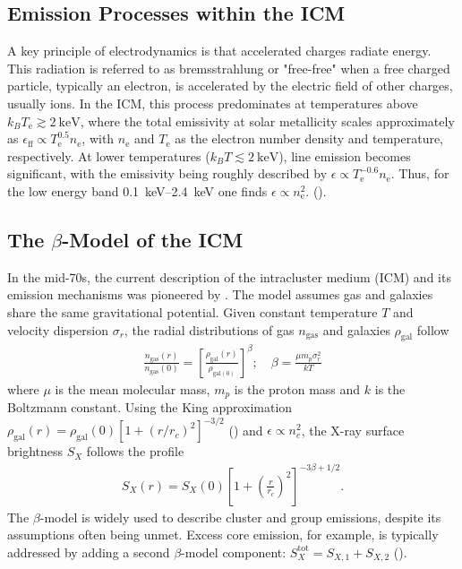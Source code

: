 \subsection{Emission Processes within the ICM}\label{subsec:emission}
A key principle of electrodynamics is that accelerated charges radiate energy. This radiation is referred to as bremsstrahlung or "free-free" when a free charged particle, typically an electron, is accelerated by the electric field of other charges, usually ions. In the ICM, this process predominates at temperatures above \(k_B T_\text{e} \gtrsim \SI{2}{\kilo\electronvolt}\), where the total emissivity at solar metallicity scales approximately as \(\epsilon_{\text{ff}} \propto T_\text{e}^{0.5} n_\text{e}\), 
with \(n_\text{e}\) and \(T_\text{e}\) as the electron number density and temperature, respectively. At lower temperatures (\(k_B T \lesssim \SI{2}{\kilo\electronvolt}\)), line emission becomes significant, with the emissivity being roughly described by \(\epsilon \propto T_\text{e}^{-0.6} n_\text{e}\).
Thus, for the low energy band \SIrange{0.1}{2.4}{\kilo\electronvolt} one finds \(\epsilon \propto n_\text{e}^2.\) (\cite{Reiprich2019}).
%
\subsection{The \(\beta\)-Model of the ICM}
In the mid-70s, the current description of the intracluster medium (ICM) and its emission mechanisms was pioneered by \cite{Cavaliere_1976}. The model assumes gas and galaxies share the same gravitational potential. Given constant temperature \(T\) and velocity dispersion \(\sigma_r\), the radial distributions of gas \(n_{\text{gas}}\) and galaxies \(\rho_{\text{gal}}\) follow
\begin{align*}
    \frac{n_\text{gas}(r)}{n_{\text{gas}}(0)} = \left[\frac{\rho_{\text{gal}}(r)}{\rho_{\text{gal}(0)}}\right]^{\beta}; \quad \beta = \frac{\mu m_p \sigma_r^2}{kT}
\end{align*}
where \(\mu\) is the mean molecular mass, \(m_p\) is the proton mass and \(k\) is the Boltzmann constant. Using the King approximation \({\textstyle \rho_{\text{gal}}(r) = \rho_{\text{gal}}(0)[1 + (r/r_c)^2]^{-3/2}}\) (\cite{King1962}) and \(\epsilon \propto n_e^2\), the X-ray surface brightness \(S_X\) follows the profile 
\begin{align*}
    S_X(r) = S_X(0)\left[1 + \left(\frac{r}{r_c}\right)^2\right]^{-3\beta + 1/2}.
\end{align*}
The \(\beta\)-model is widely used to describe cluster and group emissions, despite its assumptions often being unmet. Excess core emission, for example, is typically addressed by adding a second \(\beta\)-model component: \(S_X^{\text{tot}} = S_{X,1} + S_{X,2}\) (\cite{Reiprich2019}).
%
